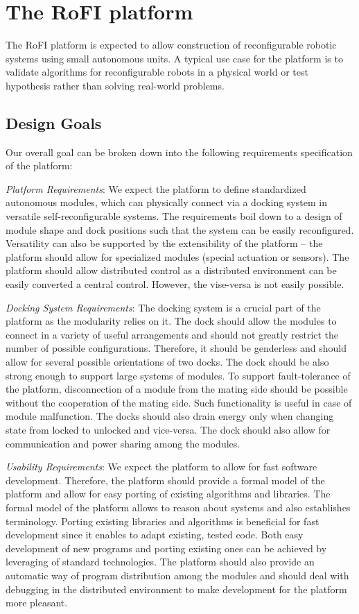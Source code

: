 \chapter{The RoFI platform}\label{chap:rofi}

The RoFI platform is expected to allow construction of reconfigurable robotic
systems using small autonomous units. A typical use case for the platform is to
validate algorithms for reconfigurable robots in a physical world or test
hypothesis rather than solving real-world problems.

\section{Design Goals}\label{sec:design_goals}

Our overall goal can be broken down into the following requirements
specification of the platform:

\emph{Platform Requirements}: We expect the platform to define standardized
autonomous modules, which can physically connect via a docking system in
versatile self-reconfigurable systems. The requirements boil down to a design of
module shape and dock positions such that the system can be easily reconfigured.
Versatility can also be supported by the extensibility of the platform -- the
platform should allow for specialized modules (special actuation or sensors).
The platform should allow distributed control as a distributed environment can
be easily converted a central control. However, the vise-versa is not easily
possible.

\emph{Docking System Requirements}: The docking system is a crucial part of the
platform as the modularity relies on it. The dock should allow the modules to
connect in a variety of useful arrangements and should not greatly restrict the
number of possible configurations. Therefore, it should be genderless and should
allow for several possible orientations of two docks. The dock should be also
strong enough to support large systems of modules. To support fault-tolerance of
the platform, disconnection of a module from the mating side should be possible
without the cooperation of the mating side. Such functionality is useful in case
of module malfunction. The docks should also drain energy only when changing
state from locked to unlocked and vice-versa. The dock should also allow for
communication and power sharing among the modules.

\emph{Usability Requirements}: We expect the platform to allow for fast software
development. Therefore, the platform should provide a formal model of the
platform and allow for easy porting of existing algorithms and libraries. The
formal model of the platform allows to reason about systems and also establishes
terminology. Porting existing libraries and algorithms is beneficial for fast
development since it enables to adapt existing, tested code. Both easy
development of new programs and porting existing ones can be achieved by
leveraging of standard technologies. The platform should also provide an
automatic way of program distribution among the modules and should deal with
debugging in the distributed environment to make development for the platform
more pleasant.

